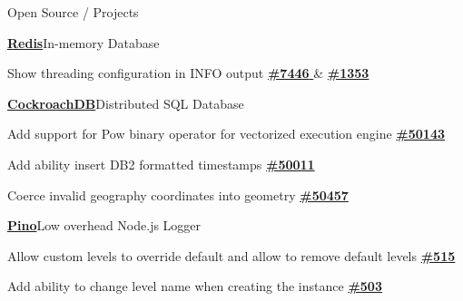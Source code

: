 \documentclass{resume}
\begin{document}
  \begin{rSection}{Open Source / Projects}
    \begin{rProjectSection}{\href{https://github.com/redis/redis}{\textbf{Redis}}}{In-memory Database}
      \item Show threading configuration in INFO output \href{https://github.com/redis/redis/pull/7446}{ \textbf{\#7446} } \& \href{https://github.com/redis/redis-doc/pull/1353}{\textbf{\#1353}}
    \end{rProjectSection}
    \vspace{-1em}
    \begin{rProjectSection}{\href{https://github.com/cockroachdb/cockroach}{\textbf {CockroachDB}}}{Distributed SQL Database}
      \item Add support for Pow binary operator for vectorized execution engine \href{https://github.com/cockroachdb/cockroach/pull/50143}{\textbf{\#50143}}
      \item Add ability insert DB2 formatted timestamps \href{https://github.com/cockroachdb/cockroach/pull/50011}{\textbf{\#50011}}
      \item Coerce invalid geography coordinates into geometry \href{https://github.com/cockroachdb/cockroach/pull/50457}{\textbf{\#50457}}
    \end{rProjectSection}
    \vspace{-1em}
    \begin{rProjectSection}{\href{https://github.com/pinojs/pino}{\textbf{Pino}}}{Low overhead Node.js Logger}
      \item Allow custom levels to override default and allow to remove default levels \href{https://github.com/pinojs/pino/pull/515}{ \textbf{\#515} }
      \item Add ability to change level name when creating the instance \href{https://github.com/pinojs/pino/pull/515}{ \textbf{\#503} }
    \end{rProjectSection}
  \end{rSection}
\end{document}
